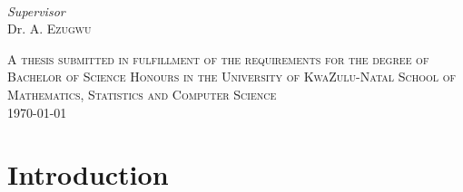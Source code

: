 \documentclass[12pt]{article}
\begin{document}
\begin{titlepage}
\begin{minipage}{0.4\textwidth}
\begin{flushleft}
		\end{flushleft}
	\end{minipage}
	~
	\begin{minipage}{0.4\textwidth}
		\begin{flushright}
			\large
			\textit{Supervisor}\\
			Dr. A. \textsc{Ezugwu}%

		\end{flushright}

	\end{minipage}
	



	
	
\vfill
\textsc{\small A thesis submitted in fulfillment of the requirements for the degree of Bachelor of Science Honours in the University of KwaZulu-Natal School of Mathematics, Statistics and Computer Science }\\
\vfill
	{\large\today} %
	
	 
	
	\vfill %
	
\end{titlepage}
\section{ Introduction }
\renewcommand{\thesubsection}{1\Alph{subsection}}
\end{document}
